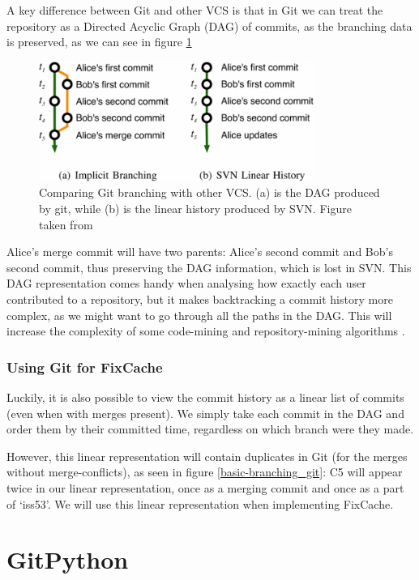 \documentclass[12pt,twoside,notitlepage]{report}
\newcommand{\fxch}{FixCache}
\begin{document}
A key difference between Git and other VCS is that in Git we can treat the repository as a Directed Acyclic Graph (DAG) of commits, as the branching data is preserved, as we can see in figure \ref{branching}
\begin{figure}[h]
\includegraphics[width=0.8\textwidth]{branching.png}
\centering

\captionsetup{width=0.8\textwidth}
\caption[Comparing Git branching with other VCS]{Comparing Git branching with other VCS. (a) is the DAG produced by git, while (b) is the linear history produced by SVN. Figure taken from \cite{Git}}
\label{branching}
\end{figure}

Alice's merge commit will have two parents: Alice's second commit and Bob's second commit, thus preserving the DAG information, which is lost in SVN. This DAG representation comes handy when analysing how exactly each user contributed to a repository, but it makes backtracking a commit history more complex, as we might want to go through all the paths in the DAG. This will increase the complexity of some code-mining and repository-mining algorithms \cite{Git}.


\subsubsection{Using Git for \fxch{}}
Luckily, it is also possible to view the commit history as a linear list of commits (even when with merges present). We simply take each commit in the DAG and order them by their committed time, regardless on which branch were they made.

However, this linear representation will contain duplicates in Git (for the merges without merge-conflicts), as seen in figure \ref{basic-branching_git}:  C5 will appear twice in our linear representation, once as a merging commit and once as a part of `iss53'. We will use this linear representation when implementing \fxch{}.
\section{GitPython}
\end{document}
